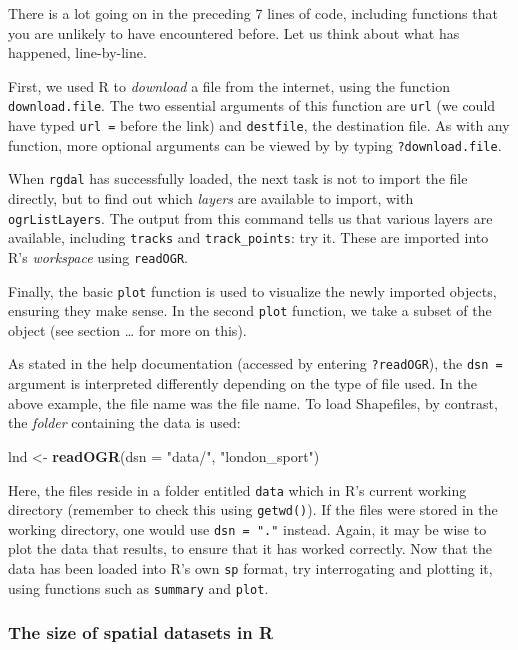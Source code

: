 \documentclass[]{article}
\newenvironment{Shaded}{}{}
\newcommand{\KeywordTok}[1]{\textcolor[rgb]{0.00,0.44,0.13}{\textbf{{#1}}}}
\newcommand{\DataTypeTok}[1]{\textcolor[rgb]{0.56,0.13,0.00}{{#1}}}
\newcommand{\StringTok}[1]{\textcolor[rgb]{0.25,0.44,0.63}{{#1}}}
\newcommand{\NormalTok}[1]{{#1}}
\begin{document}
There is a lot going on in the preceding 7 lines of code, including
functions that you are unlikely to have encountered before. Let us think
about what has happened, line-by-line.

First, we used R to \emph{download} a file from the internet, using the
function \texttt{download.file}. The two essential arguments of this
function are \texttt{url} (we could have typed \texttt{url =} before the
link) and \texttt{destfile}, the destination file. As with any function,
more optional arguments can be viewed by by typing
\texttt{?download.file}.

When \texttt{rgdal} has successfully loaded, the next task is not to
import the file directly, but to find out which \emph{layers} are
available to import, with \texttt{ogrListLayers}. The output from this
command tells us that various layers are available, including
\texttt{tracks} and \texttt{track\_points}: try it. These are imported
into R's \emph{workspace} using \texttt{readOGR}.

Finally, the basic \texttt{plot} function is used to visualize the newly
imported objects, ensuring they make sense. In the second \texttt{plot}
function, we take a subset of the object (see section \ldots{} for more
on this).

As stated in the help documentation (accessed by entering
\texttt{?readOGR}), the \texttt{dsn =} argument is interpreted
differently depending on the type of file used. In the above example,
the file name was the file name. To load Shapefiles, by contrast, the
\emph{folder} containing the data is used:

\begin{Shaded}
\begin{Highlighting}[]
\NormalTok{lnd <- }\KeywordTok{readOGR}\NormalTok{(}\DataTypeTok{dsn =} \StringTok{"data/"}\NormalTok{, }\StringTok{"london_sport"}\NormalTok{)}
\end{Highlighting}
\end{Shaded}
Here, the files reside in a folder entitled \texttt{data} which in R's
current working directory (remember to check this using
\texttt{getwd()}). If the files were stored in the working directory,
one would use \texttt{dsn = "."} instead. Again, it may be wise to plot
the data that results, to ensure that it has worked correctly. Now that
the data has been loaded into R's own \texttt{sp} format, try
interrogating and plotting it, using functions such as \texttt{summary}
and \texttt{plot}.

\subsubsection{The size of spatial datasets in R}
\end{document}
